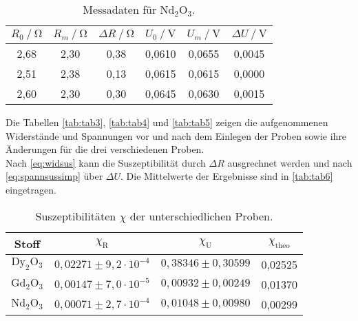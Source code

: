 \begin{table}[H]
    \centering
    \caption{Messadaten für $\text{Nd}_2 \text{O}_3$.}
    \label{tab:tab5}
    \begin{tabular}{S S S S S S}
      \toprule
        {$ R_0 \mathbin{/} \unit{\ohm} $}&{$R_m \mathbin{/} \unit{\ohm} $}&{$ \Delta R \mathbin{/} \unit{\ohm}$}&{$ U_0 \mathbin{/} \unit{\volt}$}&{$U_m \mathbin{/} \unit{\volt}$}&{$\Delta U \mathbin{/} \unit{\volt}$}\\
        \midrule
        {2,68} & {2,30} &  {0,38}&{0,0610}&{0,0655}&{0,0045}\\
        {2,51} & {2,38} &  {0,13}&{0,0615}&{0,0615}&{0,0000}\\
        {2,60} & {2,30} &  {0,30}&{0,0645}&{0,0630}&{0,0015}\\
        \bottomrule
    \end{tabular}
\end{table}

Die Tabellen \autoref{tab:tab3}, \autoref{tab:tab4} und \autoref{tab:tab5} zeigen die aufgenommenen Widerstände und Spannungen vor und nach dem
Einlegen der Proben sowie ihre Änderungen für die drei verschiedenen Proben.\\
Nach \eqref{eq:widsus} kann die Suszeptibilität durch $ \Delta R $ ausgrechnet werden und nach \eqref{eq:spannsussimp} über $\Delta U$.
Die Mittelwerte der Ergebnisse sind in \autoref{tab:tab6} eingetragen.


\begin{table}[H]
    \centering
    \caption{Suszeptibilitäten $\chi$ der unterschiedlichen Proben.}
    \label{tab:tab6}
    \begin{tabular}{S S S S}
      \toprule
       {Stoff} & {$\chi_{\text{R}}$} & {$\chi_{\text{U}}$} &{$\chi_{\text{theo}}$}  \\
      \midrule
      {$\text{Dy}_2\text{O}_3$}  &{$0,02271 \pm 9,2 \cdot 10^{-4}$}    &{$ 0,38346 \pm 0,30599$} &{0,02525}         \\
      {$\text{Gd}_2\text{O}_3$}  &{$0,00147 \pm 7,0 \cdot 10^{-5}$}    &{$ 0,00932 \pm 0,00249$} &{0,01370}         \\
      {$\text{Nd}_2\text{O}_3$}  &{$0,00071 \pm 2,7 \cdot 10^{-4}$}    &{$ 0,01048 \pm 0,00980$} &{0,00299}         \\
      \bottomrule
    \end{tabular}
\end{table}
